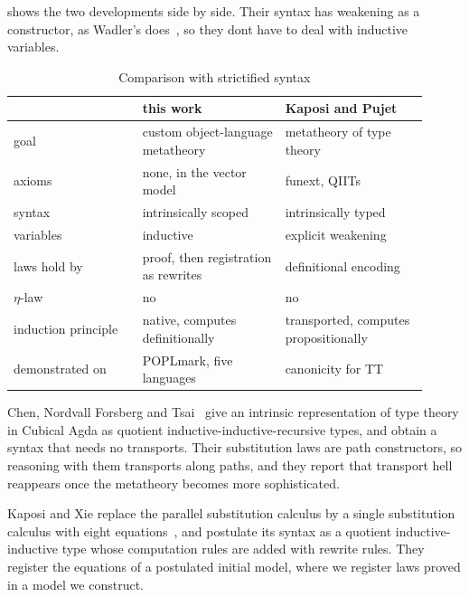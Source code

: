 \documentclass[sigplan,anonymous,review]{acmart}
\theoremstyle{acmdefinition}
\begin{document}
 shows the two developments side by side. Their syntax has
weakening as a constructor, as Wadler's does~\cite{Wadler_2024}, so they dont
have to deal with inductive variables.

\begin{table}[t]
  \centering\footnotesize
  \caption{Comparison with strictified syntax}\label{tab:kp}
  \setlength{\tabcolsep}{4pt}
  \begin{tabular}{@{}>{\raggedright\arraybackslash}p{0.29\linewidth}>{\raggedright\arraybackslash}p{0.31\linewidth}>{\raggedright\arraybackslash}p{0.31\linewidth}@{}}
    \toprule
                        & this work                            & Kaposi and Pujet                      \\
    \midrule
    goal                & custom object-language metatheory    & metatheory of type theory             \\
    axioms              & none, in the vector model            & funext, QIITs                         \\
    syntax              & intrinsically scoped                 & intrinsically typed                   \\
    variables           & inductive                            & explicit weakening                    \\
    laws hold by        & proof, then registration as rewrites & definitional encoding                 \\
    $\eta$-law          & no                                   & no                                    \\
    induction principle & native, computes definitionally      & transported, computes propositionally \\
    demonstrated on     & POPLmark, five languages             & canonicity for TT                     \\
    \bottomrule
  \end{tabular}
\end{table}

Chen, Nordvall Forsberg and Tsai~\cite{10.1145/3779031.3779090} give an
intrinsic representation of type theory in Cubical Agda as quotient
inductive-inductive-recursive types, and obtain a syntax that needs no
transports. Their substitution laws are path constructors, so reasoning with
them transports along paths, and they report that transport hell reappears once
the metatheory becomes more sophisticated.

Kaposi and Xie replace the parallel substitution calculus by a single
substitution calculus with eight equations~\cite{kaposi2025single}, and
postulate its syntax as a quotient inductive-inductive type whose computation
rules are added with rewrite rules. They register the equations of a postulated
initial model, where we register laws proved in a model we construct.
\end{document}
